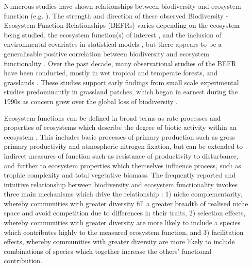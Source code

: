 \documentclass[11pt,a4paper]{article}
\begin{document}
Numerous studies have shown relationships between biodiversity and ecosystem function (e.g. \citealt{Liang2016, Cardinale2009}). The strength and direction of these observed Biodiversity - Ecosystem Function Relationships (BEFRs) varies depending on the ecosystem being studied, the ecosystem function(s) of interest \citep{Hector2007}, and the inclusion of environmental covariates in statistical models \citep{Vila2005}, but there appears to be a generalisable positive correlation between biodiversity and ecosystem functionality \citep{Liang2016}. Over the past decade, many observational studies of the BEFR have been conducted, mostly in wet tropical and temperate forests, and grasslands \citep{Chen2011}. These studies support early findings from small scale experimental studies predominantly in grassland patches, which began in earnest during the 1990s as concern grew over the global loss of biodiversity \citep{Tilman1994, Tilman2014}.

Ecosystem functions can be defined in broad terms as rate processes and properties of ecosystems which describe the degree of biotic activity within an ecosystem \citep{Jax2005}. This includes basic processes of primary production such as gross primary productivity and atmospheric nitrogen fixation, but can be extended to indirect measures of function such as resistance of productivity to disturbance, and further to ecosystem properties which themselves influence process, such as trophic complexity and total vegetative biomass. The frequently reported and intuitive relationship between biodiversity and ecosystem functionality invokes three main mechanisms which drive the relationship \citep{Tilman2014}: 1) niche complementarity, whereby communities with greater diversity fill a greater breadth of realised niche space and avoid competition due to differences in their traits, 2) selection effects, whereby communities with greater diversity are more likely to include a species which contributes highly to the measured ecosystem function, and 3) facilitation effects, whereby communities with greater diversity are more likely to include combinations of species which together increase the others' functional contribution.
\end{document}
